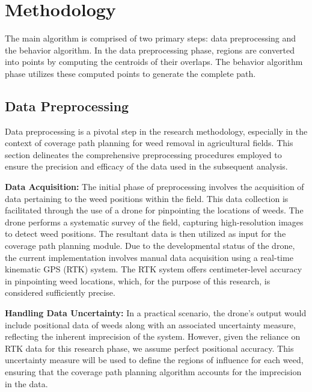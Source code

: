 \chapter{Methodology}

The main algorithm is comprised of two primary steps: data preprocessing and the behavior algorithm. In the data preprocessing phase, regions are converted into points by computing the centroids of their overlaps. The behavior algorithm phase utilizes these computed points to generate the complete path.

\section{Data Preprocessing}


Data preprocessing is a pivotal step in the research methodology, especially in the context of coverage path planning for weed removal in agricultural fields. This section delineates the comprehensive preprocessing procedures employed to ensure the precision and efficacy of the data used in the subsequent analysis.

\vspace{3mm}  


\textbf{Data Acquisition: }
The initial phase of preprocessing involves the acquisition of data pertaining to the weed positions within the field. This data collection is facilitated through the use of a drone for pinpointing the locations of weeds. The drone performs a systematic survey of the field, capturing high-resolution images to detect weed positions. The resultant data is then utilized as input for the coverage path planning module. Due to the developmental status of the drone, the current implementation involves manual data acquisition using a real-time kinematic GPS (RTK) system. The RTK system offers centimeter-level accuracy in pinpointing weed locations, which, for the purpose of this research, is considered sufficiently precise. 

\vspace{3mm}  


\textbf{Handling Data Uncertainty: }
In a practical scenario, the drone's output would include positional data of weeds along with an associated uncertainty measure, reflecting the inherent imprecision of the system. However, given the reliance on RTK data for this research phase, we assume perfect positional accuracy. This uncertainty measure will be used to define the regions of influence for each weed, ensuring that the coverage path planning algorithm accounts for the imprecision in the data. 


